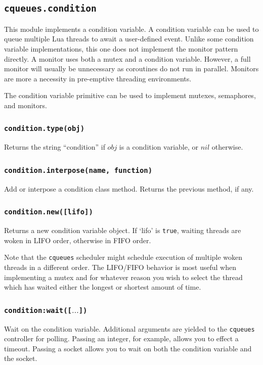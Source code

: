 \documentclass[11pt, oneside]{memoir}
\newcommand*{\cqueues}[0]{\texttt{cqueues}\xspace}
\newcommand*{\fn}[1]{\texttt{#1}\xspace}
\newcounter{toccols}
\newenvironment{Module}[1]{
	\subsection{\texttt{#1}}
	\addtocontents{toc}{
		\protect\begin{multicols}{\value{toccols}}
	}
}{
	\addtocontents{toc}{\protect\end{multicols}}
}
\begin{document}
\begin{Module}{cqueues.condition}

This module implements a condition variable. A condition variable can be used to queue multiple Lua threads to await a user-defined event. Unlike some condition variable implementations, this one does not implement the monitor pattern directly. A monitor uses both a mutex and a condition variable. However, a full monitor will usually be unnecessary as coroutines do not run in parallel. Monitors are more a necessity in pre-emptive threading environments.

The condition variable primitive can be used to implement mutexes, semaphores, and monitors.

\subsubsection[\fn{condition.type}]{\fn{condition.type(obj)}}

Returns the string ``condition'' if $obj$ is a condition variable, or $nil$ otherwise.

\subsubsection[\fn{condition.interpose}]{\fn{condition.interpose(name, function)}}

Add or interpose a condition class method. Returns the previous method, if any.

\subsubsection[\fn{condition.new}]{\fn{condition.new([lifo])}}

Returns a new condition variable object. If `lifo' is \texttt{true}, waiting threads are woken
in LIFO order, otherwise in FIFO order.

Note that the \cqueues scheduler might schedule execution of multiple woken threads in a different order. The LIFO/FIFO behavior is most useful when implementing a mutex and for whatever reason you wish to select the thread which has waited either the longest or shortest amount of time.

\subsubsection[\fn{condition:wait}]{\fn{condition:wait([$\ldots$])}}

Wait on the condition variable. Additional arguments are yielded to the \cqueues controller for polling. Passing an integer, for example, allows you to effect a timeout. Passing a socket allows you to wait on both the condition variable and the socket.


\end{Module}
\end{document}
